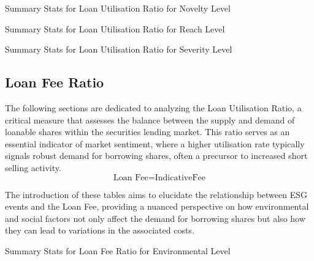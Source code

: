 \begin{table}[H]
\caption{Summary Stats for Loan Utilisation Ratio for Novelty Level}
\centering

\label{table:loan_utilisation_ratio_novelty.tex}
\end{table}

\begin{table}[H]
\caption{Summary Stats for Loan Utilisation Ratio for Reach Level}
\centering

\label{table:loan_utilisation_ratio_reach.tex}
\end{table}

\begin{table}[H]
\caption{Summary Stats for Loan Utilisation Ratio for Severity Level}
\centering

\label{table:loan_utilisation_ratio_severity.tex}
\end{table}


\subsection{Loan Fee Ratio}

The following sections are dedicated to analyzing the Loan Utilisation Ratio, a critical measure that assesses the balance between the supply and demand of loanable shares within the securities lending market. This ratio serves as an essential indicator of market sentiment, where a higher utilisation rate typically signals robust demand for borrowing shares, often a precursor to increased short selling activity.
 \begin{equation}
	\text{Loan Fee} = \text{IndicativeFee}
	\label{eq:Loan_Fee}
\end{equation}

The introduction of these tables aims to elucidate the relationship between ESG events and the Loan Fee, providing a nuanced perspective on how environmental and social factors not only affect the demand for borrowing shares but also how they can lead to variations in the associated costs.

\begin{table}[H]
\caption{Summary Stats for Loan Fee Ratio for Environmental Level}
\centering

\label{table:loan_fee_environment.tex}
\end{table}

